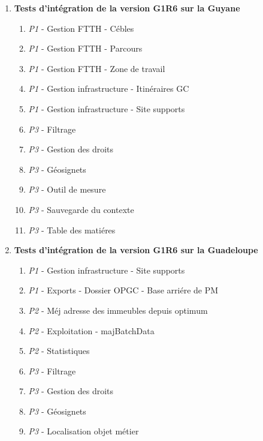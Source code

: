 \begin{enumerate}[label= Semaine \no\textbf{\arabic*.},itemsep=20pt]
\item \textbf{Tests d'intégration de la version G1R6 sur la Guyane}
\begin{enumerate}[label = Tests \no\arabic*.,align=left]
\item  \emph{\colorbox{rouge}{P1}} - Gestion FTTH - Cébles
\item \emph{\colorbox{rouge}{P1}} - Gestion FTTH - Parcours
\item\emph{\colorbox{rouge}{P1}} -  Gestion FTTH - Zone de travail
\item \emph{\colorbox{rouge}{P1}} - Gestion infrastructure - Itinéraires GC
\item \emph{\colorbox{rouge}{P1}} - Gestion infrastructure - Site supports
\item \emph{\colorbox{rouge-tres-clair}{P3}} - Filtrage
\item \emph{\colorbox{rouge-tres-clair}{P3}} - Gestion des droits
\item \emph{\colorbox{rouge-tres-clair}{P3}} - Géosignets
\item \emph{\colorbox{rouge-tres-clair}{P3}} - Outil de mesure
\item \emph{\colorbox{rouge-tres-clair}{P3}} - Sauvegarde du contexte
\item \emph{\colorbox{rouge-tres-clair}{P3}} - Table des matiéres
\end{enumerate}

\item \textbf{Tests d'intégration de la version G1R6 sur la Guadeloupe}
\begin{enumerate}[label = Tests \no\arabic*.,align=left]
\item \emph{\colorbox{rouge}{P1}} - Gestion infrastructure - Site supports
\item \emph{\colorbox{rouge}{P1}} - Exports - Dossier OPGC - Base arriére de PM
\item \emph{\colorbox{rouge-clair}{P2}} - Méj adresse des immeubles depuis optimum
\item \emph{\colorbox{rouge-clair}{P2}} - Exploitation - majBatchData
\item \emph{\colorbox{rouge-clair}{P2}} - Statistiques
\item \emph{\colorbox{rouge-tres-clair}{P3}} - Filtrage
\item \emph{\colorbox{rouge-tres-clair}{P3}} - Gestion des droits
\item \emph{\colorbox{rouge-tres-clair}{P3}} - Géosignets
\item \emph{\colorbox{rouge-tres-clair}{P3}} - Localisation objet métier
\end{enumerate}


\end{enumerate}
